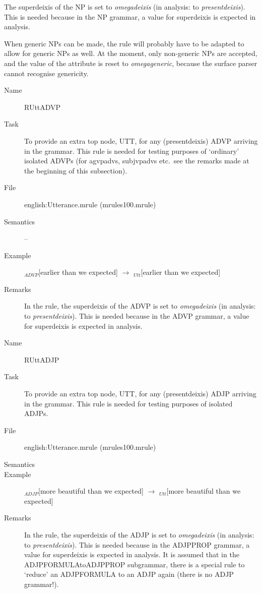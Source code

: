 \begin{description}
\begin{description}
The superdeixis of the NP is set to {\em omegadeixis\/} (in analysis: to {\em 
presentdeixis\/}). This is needed because in the NP grammar, a value for 
superdeixis is expected in analysis.

When generic NPs can be made, the rule will probably have to be adapted to 
allow for generic NPs as well. At the moment, only non-generic NPs are 
accepted, and the value of the attribute is reset to {\em omegageneric\/}, 
because the surface parser cannot recognise genericity.
\end{description}

\vspace{1 cm}
\begin{description}
\item[Name] RUttADVP
\item[Task] To provide an extra top node, UTT, for any (presentdeixis) ADVP
arriving in the grammar. This rule is needed for testing purposes of `ordinary'
isolated ADVPs (for agvpadvs, subjvpadvs etc.\ see the remarks made at the 
beginning of this subsection).
\item[File] english:Utterance.mrule (mrules100.mrule)
\item[Semantics] --
\item[Example] $_{ADVP}$[earlier than we expected] $\rightarrow$ 
$_{Utt}$[earlier than we expected]
\item[Remarks] In the rule, the superdeixis of the ADVP is set to {\em 
omegadeixis\/} (in analysis: to {\em presentdeixis\/}). This is needed because 
in the ADVP grammar, a value for superdeixis is expected in analysis.
\end{description}

\vspace{1 cm}
\begin{description}
\item[Name] RUttADJP
\item[Task] To provide an extra top node, UTT, for any (presentdeixis) ADJP
arriving in the grammar. This rule is needed for testing purposes of isolated 
ADJPs.
\item[File] english:Utterance.mrule (mrules100.mrule)
\item[Semantics] 
\item[Example] $_{ADJP}$[more beautiful than we expected] $\rightarrow$ 
$_{Utt}$[more beautiful than we expected]
\item[Remarks] In the rule, the superdeixis of the ADJP is set to {\em 
omegadeixis\/} (in analysis: to {\em presentdeixis\/}). This is needed because 
in the ADJPPROP grammar, a value for superdeixis is expected in analysis.
It is assumed that in 
the ADJPFORMULAtoADJPPROP subgrammar, there is a special rule to `reduce' an 
ADJPFORMULA to an ADJP again (there is no ADJP grammar!).
\end{description}


\end{description}
